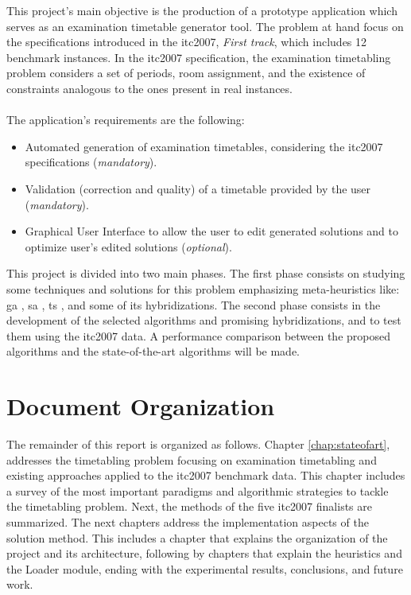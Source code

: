 This project's main objective is the production of a prototype application which serves as an examination timetable generator tool. The problem at hand focus on the specifications introduced in the \gls{itc2007}, \textit{First track}, which includes 12 benchmark instances. In the \gls{itc2007} specification, the examination timetabling problem considers a set of periods, room assignment, and the existence of constraints analogous to the ones present in real instances.\\
\\
The application's requirements are the following:
\begin{itemize}
	\item Automated generation of examination timetables, considering the \gls{itc2007} specifications (\textit{mandatory}).
	\item Validation (correction and quality) of a timetable provided by the user (\textit{mandatory}).
	\item Graphical User Interface to allow the user to edit generated solutions and to optimize user's edited solutions (\textit{optional}).
\end{itemize}
This project is divided into two main phases. The first phase consists on studying some techniques and solutions for this problem emphasizing meta-heuristics like: \gls{ga} \cite{Abdullah2012}, \gls{sa} \cite{Kirkpatrick1983}, \gls{ts} \cite{Smet2007}, and some of its hybridizations. The second phase consists in the development of the selected algorithms and promising hybridizations, and to test them using the \gls{itc2007} data. A performance comparison between the proposed algorithms and the state-of-the-art algorithms will be made.

\section{Document Organization}

The remainder of this report is organized as follows. Chapter \ref{chap:stateofart}, addresses the timetabling problem focusing on examination timetabling and existing approaches applied to the \gls{itc2007} benchmark data. This chapter includes a survey of the most important paradigms and algorithmic strategies to tackle the timetabling problem. Next, the methods of the five \gls{itc2007} finalists are summarized. The next chapters address the implementation aspects of the solution method. This includes a chapter that explains the organization of the project and its architecture, following by chapters that explain the heuristics and the Loader module, ending with the experimental results, conclusions, and future work.
